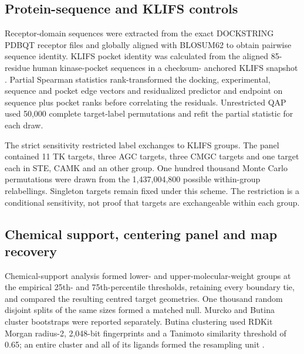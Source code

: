 \documentclass[11pt]{article}
\begin{document}
\subsection{Protein-sequence and KLIFS controls}

Receptor-domain sequences were extracted from the exact DOCKSTRING PDBQT receptor files and
globally aligned with BLOSUM62 to obtain pairwise sequence identity. KLIFS pocket identity
was calculated from the aligned 85-residue human kinase-pocket sequences in a checksum-
anchored KLIFS snapshot \cite{vanlinden2014,kooistra2016}. Partial Spearman statistics rank-transformed the docking,
experimental, sequence and pocket edge vectors and residualized predictor and endpoint on
sequence plus pocket ranks before correlating the residuals. Unrestricted QAP used 50,000
complete target-label permutations and refit the partial statistic for each draw.

The strict sensitivity restricted label exchanges to KLIFS groups. The panel contained 11
TK targets, three AGC targets, three CMGC targets and one target each in STE, CAMK and an
other group. One hundred thousand Monte Carlo permutations were drawn from the
1,437,004,800 possible within-group relabellings. Singleton targets remain fixed under this
scheme. The restriction is a conditional sensitivity, not proof that targets are
exchangeable within each group.

\subsection{Chemical support, centering panel and map recovery}

Chemical-support analysis formed lower- and upper-molecular-weight groups at the empirical
25th- and 75th-percentile thresholds, retaining every boundary tie, and compared the
resulting centred target geometries. One thousand random
disjoint splits of the same sizes formed a matched null. Murcko and Butina cluster
bootstraps were reported separately. Butina clustering used RDKit Morgan radius-2,
2,048-bit fingerprints and a Tanimoto similarity threshold of 0.65; an entire cluster and
all of its ligands formed the resampling unit \cite{morgan1965,rogers2010,butina1999,rdkit2025}.
\end{document}

